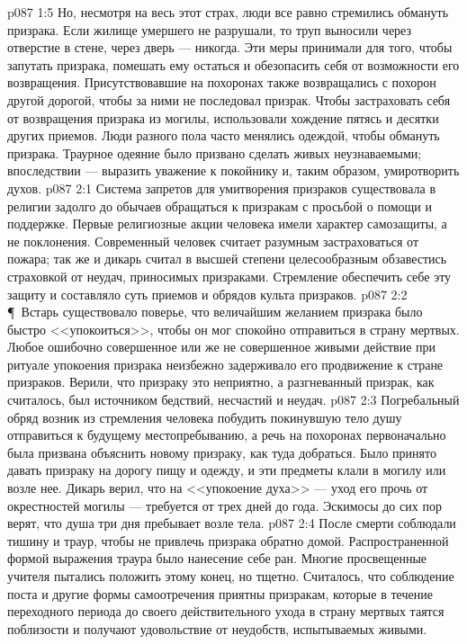 \vs p087 1:5 Но, несмотря на весь этот страх, люди все равно стремились обмануть призрака. Если жилище умершего не разрушали, то труп выносили через отверстие в стене, через дверь --- никогда. Эти меры принимали для того, чтобы запутать призрака, помешать ему остаться и обезопасить себя от возможности его возвращения. Присутствовавшие на похоронах также возвращались с похорон другой дорогой, чтобы за ними не последовал призрак. Чтобы застраховать себя от возвращения призрака из могилы, использовали хождение пятясь и десятки других приемов. Люди разного пола часто менялись одеждой, чтобы обмануть призрака. Траурное одеяние было призвано сделать живых неузнаваемыми; впоследствии --- выразить уважение к покойнику и, таким образом, умиротворить духов.
\vs p087 2:1 Система запретов для умитворения призраков существовала в религии задолго до обычаев обращаться к призракам с просьбой о помощи и поддержке. Первые религиозные акции человека имели характер самозащиты, а не поклонения. Современный человек считает разумным застраховаться от пожара; так же и дикарь считал в высшей степени целесообразным обзавестись страховкой от неудач, приносимых призраками. Стремление обеспечить себе эту защиту и составляло суть приемов и обрядов культа призраков.
\vs p087 2:2 \P\ Встарь существовало поверье, что величайшим желанием призрака было быстро <<упокоиться>>, чтобы он мог спокойно отправиться в страну мертвых. Любое ошибочно совершенное или же не совершенное живыми действие при ритуале упокоения призрака неизбежно задерживало его продвижение к стране призраков. Верили, что призраку это неприятно, а разгневанный призрак, как считалось, был источником бедствий, несчастий и неудач.
\vs p087 2:3 Погребальный обряд возник из стремления человека побудить покинувшую тело душу отправиться к будущему местопребыванию, а речь на похоронах первоначально была призвана объяснить новому призраку, как туда добраться. Было принято давать призраку на дорогу пищу и одежду, и эти предметы клали в могилу или возле нее. Дикарь верил, что на <<упокоение духа>> --- уход его прочь от окрестностей могилы --- требуется от трех дней до года. Эскимосы до сих пор верят, что душа три дня пребывает возле тела.
\vs p087 2:4 После смерти соблюдали тишину и траур, чтобы не привлечь призрака обратно домой. Распространенной формой выражения траура было нанесение себе ран. Многие просвещенные учителя пытались положить этому конец, но тщетно. Считалось, что соблюдение поста и другие формы самоотречения приятны призракам, которые в течение переходного периода до своего действительного ухода в страну мертвых таятся поблизости и получают удовольствие от неудобств, испытываемых живыми.
